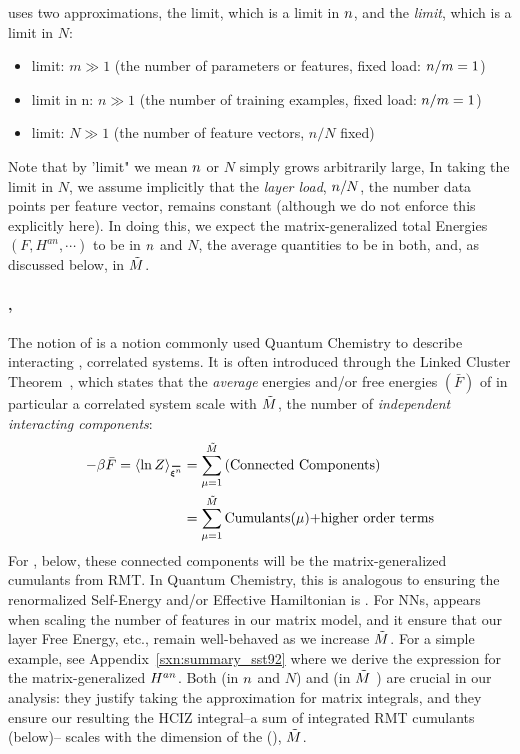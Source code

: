 \SETOL uses two \LargeN approximations, the \Thermodynamic limit, which is a \LargeN limit in $n$, and the \emph{\WideLayer limit}, which is a \LargeN limit in $N$:
\begin{itemize}
    \item \Thermodynamic limit: $m \gg 1$ (the number of parameters or features, fixed load: $n/m = 1$)
    \item \LargeN limit in n: $n\gg 1$ (the number of training examples, fixed load: $n/m = 1$)
    \item \WideLayer limit: $N\gg 1$ (the number of feature vectors,  $n/N$ fixed)
\end{itemize}
Note that by 'limit" we mean $n$ or $N$ simply grows arbitrarily large,  In taking the \WideLayer \LargeN limit in $N$, we assume implicitly that  the \emph{layer load}, $n/N$, the number data points per feature vector, remains constant (although we do not enforce this explicitly here).  
In doing this, we expect the matrix-generalized total Energies $(F, H^{an}, \cdots)$ to be \SizeExtensive in $n$ and $N$,  the average quantities to be \SizeIntensive in both, 
and, as discussed below, \emph{\SizeConsistent} in $\tilde{M}$.

\paragraph{\SizeConsistency,}  
The notion of \emph{\SizeConsistency} is a notion commonly 
used Quantum Chemistry to describe interacting , correlated systems. It is often introduced through the Linked Cluster Theorem~\cite{Hubbard1959,Brandow1963},
which states that the \emph{average} energies and/or free energies $(\bar{F})$ of in particular a correlated system scale with $\tilde{M}$,
the number of \emph{independent interacting components}:
\begin{align}
  \label{eqn:LCT}
  -\beta \bar{F}=\langle \ln Z \rangle_{\AVGNDXIn} &= \sum_{\mu=1}^{\MECS}\text{(Connected Components)} \nonumber \\
  &= \sum_{\mu=1}^{\MECS}\text{Cumulants($\mu$)+higher order terms} 
\end{align}
For \SETOL, below, these connected components will be the matrix-generalized cumulants from RMT.
In Quantum Chemistry, this is analogous to ensuring the renormalized Self-Energy and/or Effective Hamiltonian is \SizeConsistent.
For NNs, \SizeConsistency appears when scaling the number of features in our matrix model,
and it ensure that our layer Free Energy, etc.,  remain well-behaved as we increase $\tilde{M}$.
For a simple example, see Appendix~\ref{sxn:summary_sst92}
 where we derive the expression for the matrix-generalized
\AnnealedHamiltonian $H^{an}$.  
Both \SizeExtensivity (in $n$ and $N$) and \SizeConsistency (in $\tilde{M}$ )
are crucial in our \SETOL analysis:  they justify taking the \LargeN approximation for matrix integrals, and they ensure
our resulting the HCIZ integral--a sum of integrated RMT cumulants (below)--
scales with the dimension of the \EffectiveCorrelationSpace (\ECS), $\tilde{M}$.  


